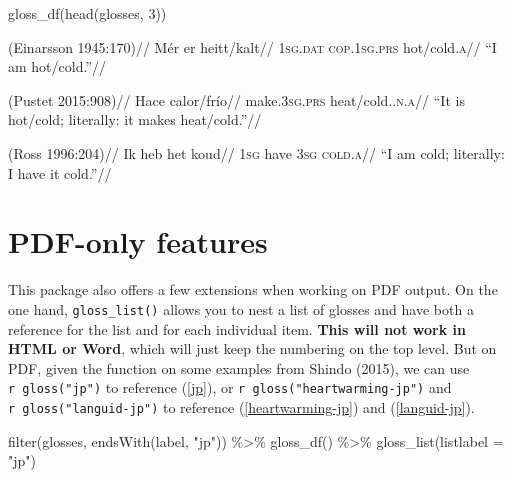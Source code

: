 \documentclass[
  letterpaper,
  DIV=11,
  numbers=noendperiod]{scrartcl}
\newenvironment{Shaded}{\begin{snugshade}}{\end{snugshade}}
\newcommand{\AttributeTok}[1]{\textcolor[rgb]{0.40,0.45,0.13}{#1}}
\newcommand{\DecValTok}[1]{\textcolor[rgb]{0.68,0.00,0.00}{#1}}
\newcommand{\FunctionTok}[1]{\textcolor[rgb]{0.28,0.35,0.67}{#1}}
\newcommand{\NormalTok}[1]{\textcolor[rgb]{0.00,0.23,0.31}{#1}}
\newcommand{\SpecialCharTok}[1]{\textcolor[rgb]{0.37,0.37,0.37}{#1}}
\newcommand{\StringTok}[1]{\textcolor[rgb]{0.13,0.47,0.30}{#1}}
\begin{document}
\begin{Shaded}
\begin{Highlighting}[]
\FunctionTok{gloss\_df}\NormalTok{(}\FunctionTok{head}\NormalTok{(glosses, }\DecValTok{3}\NormalTok{))}
\end{Highlighting}
\end{Shaded}


\ex\label{feel-icelandic} \begingl \glpreamble (Einarsson 1945:170)//
\gla Mér er heitt/kalt// \glb \textsc{1sg.dat} \textsc{cop.1sg.prs}
hot/cold.\textsc{a}// \glft ``I am hot/cold.''// \endgl \xe

\ex\label{amb-spanish} \begingl \glpreamble (Pustet 2015:908)//
\gla Hace calor/frío// \glb make.\textsc{3sg.prs}
heat/cold.\textsc{.n.a}// \glft ``It is hot/cold; literally: it makes
heat/cold.''// \endgl \xe

\ex\label{feel-dutch} \begingl \glpreamble (Ross 1996:204)// \gla Ik heb
het koud// \glb \textsc{1sg} have \textsc{3sg} \textsc{cold.a}//
\glft ``I am cold; literally: I have it cold.''// \endgl \xe

\hypertarget{pdf-only-features}{%
\section{PDF-only features}\label{pdf-only-features}}

This package also offers a few extensions when working on PDF output. On
the one hand, \texttt{gloss\_list()} allows you to nest a list of
glosses and have both a reference for the list and for each individual
item. \textbf{This will not work in HTML or Word}, which will just keep
the numbering on the top level. But on PDF, given the function on some
examples from Shindo (2015), we can use
\texttt{\textasciigrave{}r\ gloss("jp")\textasciigrave{}} to reference
(\ref{jp}), or
\texttt{\textasciigrave{}r\ gloss("heartwarming-jp")\textasciigrave{}}
and \texttt{\textasciigrave{}r\ gloss("languid-jp")\textasciigrave{}} to
reference (\ref{heartwarming-jp}) and (\ref{languid-jp}).

\begin{Shaded}
\begin{Highlighting}[]
\FunctionTok{filter}\NormalTok{(glosses, }\FunctionTok{endsWith}\NormalTok{(label, }\StringTok{"jp"}\NormalTok{)) }\SpecialCharTok{\%\textgreater{}\%} 
  \FunctionTok{gloss\_df}\NormalTok{() }\SpecialCharTok{\%\textgreater{}\%} 
  \FunctionTok{gloss\_list}\NormalTok{(}\AttributeTok{listlabel =} \StringTok{"jp"}\NormalTok{)}
\end{Highlighting}
\end{Shaded}
\end{document}
